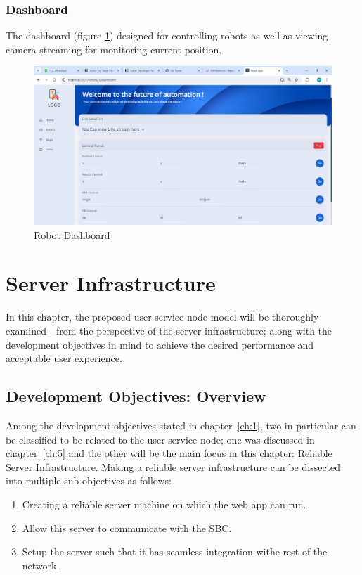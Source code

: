     \subsection{Dashboard}

     The dashboard (figure \ref{fig:dashboard}) designed for controlling robots as well as viewing camera streaming for monitoring current position.

    \begin{figure}[h!]
        \centering
        \includegraphics[scale=0.4]{Figures/WebApp/dashbaord.png}
        \caption{Robot Dashboard}
        \label{fig:dashboard}
    \end{figure}



\newpage

\chapter{Server Infrastructure}
In this chapter, the proposed user service node model will be thoroughly examined---from the perspective of the server infrastructure; along with the development objectives in mind to achieve the desired performance and acceptable user experience.

\section{Development Objectives: Overview}
Among the development objectives stated in chapter~\ref{ch:1}, two in particular can be classified to be related to the user service node; one was discussed in chapter~\ref{ch:5} and the other will be the main focus in this chapter: Reliable Server Infrastructure. Making a reliable server infrastructure can be dissected into multiple sub-objectives as follows:
\begin{enumerate}
    \item Creating a reliable server machine on which the web app can run.
    \item Allow this server to communicate with the SBC.
    \item Setup the server such that it has seamless integration withe rest of the network.
\end{enumerate}


